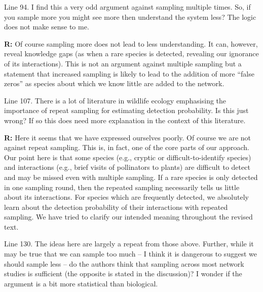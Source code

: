 \documentclass[12pt]{letter}
\newenvironment{refquote}{\bigskip \begin{it}}{\end{it}\smallskip}
\begin{document}
		\begin{refquote}
		Line 94.  I find this a very odd argument against sampling multiple times.  So, if you sample more you might see more then understand the system less?  The logic does not make sense to me. 
		\end{refquote}


		\textbf{R:} Of course sampling more does not lead to less understanding. It can, however, reveal knowledge gaps (as when a rare species is detected, revealing our ignorance of its interactions). This is not an argument against multiple sampling but a statement that increased sampling is likely to lead to the addition of more ``false zeros'' as species about which we know little are added to the network.


		\begin{refquote}
		Line 107.  There is a lot of literature in wildlife ecology emphasising the importance of repeat sampling for estimating detection probability.  Is this just wrong?  If so this does need more explanation in the context of this literature.
		\end{refquote}


		\textbf{R:} Here it seems that we have expressed ourselves poorly. Of course we are not against repeat sampling. This is, in fact, one of the core parts of our approach. Our point here is that some species (e.g., cryptic or difficult-to-identify species) and interactions (e.g., brief visits of pollinators to plants) are difficult to detect and may be missed even with multiple sampling. If a rare species is only detected in one sampling round, then the repeated sampling necessarily tells us little about its interactions. For species which are frequently detected, we absolutely learn about the detection probability of their interactions with repeated sampling. We have tried to clarify our intended meaning throughout the revised text.


		\begin{refquote}
		Line 130.  The ideas here are largely a repeat from those above.  Further, while it may be true that we can sample too much – I think it is dangerous to suggest we should sample less – do the authors think that sampling across most network studies is sufficient (the opposite is stated in the discussion)?  I wonder if the argument is a bit more statistical than biological.
		\end{refquote}
\end{document}
